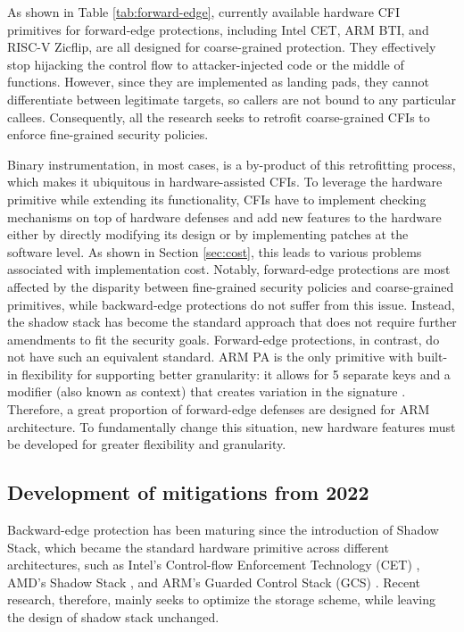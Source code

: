 \documentclass[journal,onecolumn]{IEEEtran}
\begin{document}
As shown in Table \ref{tab:forward-edge}, currently available hardware CFI primitives for forward-edge protections, including Intel CET, ARM BTI, and RISC-V Zicflip, are all designed for coarse-grained protection. They effectively stop hijacking the control flow to attacker-injected code or the middle of functions. However, since they are implemented as landing pads, they cannot differentiate between legitimate targets, so callers are not bound to any particular callees. Consequently, all the research seeks to retrofit coarse-grained CFIs to enforce fine-grained security policies.

Binary instrumentation, in most cases, is a by-product of this retrofitting process, which makes it ubiquitous in hardware-assisted CFIs. To leverage the hardware primitive while extending its functionality, CFIs have to implement checking mechanisms on top of hardware defenses and add new features to the hardware either by directly modifying its design or by implementing patches at the software level. As shown in Section \ref{sec:cost}, this leads to various problems associated with implementation cost. Notably, forward-edge protections are most affected by the disparity between fine-grained security policies and coarse-grained primitives, while backward-edge protections do not suffer from this issue. Instead, the shadow stack has become the standard approach that does not require further amendments to fit the security goals. Forward-edge protections, in contrast, do not have such an equivalent standard. ARM PA is the only primitive with built-in flexibility for supporting better granularity: it allows for 5 separate keys and a modifier (also known as context) that creates variation in the signature \cite{ARMPA}. Therefore, a great proportion of forward-edge defenses are designed for ARM architecture. To fundamentally change this situation, new hardware features must be developed for greater flexibility and granularity.

\subsection{Development of mitigations from 2022}

Backward-edge protection has been maturing since the introduction of Shadow Stack, which became the standard hardware primitive across different architectures, such as Intel's Control-flow Enforcement Technology (CET) \cite{ControlflowEnforcementTechnology}, AMD's Shadow Stack \cite{InfinityGuard}, and ARM's Guarded Control Stack (GCS) \cite{ArmArchitectureReference}. Recent research, therefore, mainly seeks to optimize the storage scheme, while leaving the design of shadow stack unchanged.
\end{document}
